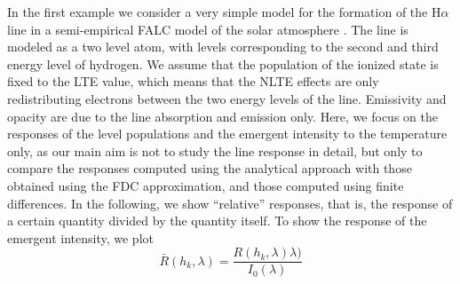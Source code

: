 \documentclass[referee]{aa}
\begin{document}
In the first example we consider a very simple model for the formation of the H$\alpha$ line in a semi-empirical FALC model of the solar atmosphere \citep{FALC}. The line is modeled as a two level atom, with levels corresponding to the second and third energy level of hydrogen. We assume that the population of the ionized state is fixed to the LTE value, which means that the NLTE effects are only redistributing electrons between the two energy levels of the line. Emissivity and opacity are due to the line absorption and emission only. Here, we focus on the responses of the level populations and the emergent intensity to the temperature only, as our main aim is not to study the line response in detail, but only to compare the responses computed using the analytical approach with those obtained using the FDC approximation, and those computed using finite differences. In the following, we  show ``relative'' responses, that is, the response of a certain quantity divided by the quantity itself. To show the response of the emergent intensity, we plot
\begin{equation}
 \bar{R}(h_k,\lambda) = \frac{R(h_k,\lambda)\lambda)}{I_0(\lambda)}
\end{equation}
\end{document}

